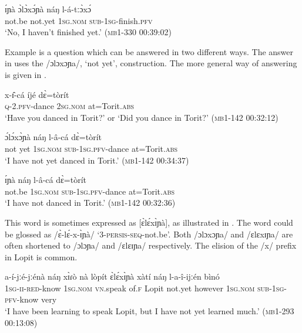 \documentclass[output=paper,colorlinks,citecolor=brown,draftmode]{langscibook}
\begin{document}
\ea\label{ex:lop:8}
        \gll ɪ́ɲà ɔ̀lɔ̀xɔ́ɲà náŋ l-á-tːɔ̀xɔ́ \\ 
             not.be {not.yet} \textsc{1sg.nom} \textsc{sub}{}-1\textsc{sg}{}-finish.\textsc{pfv} \\
        \glt ‘No, I haven’t finished yet.’ (\textsc{mb1-330} \textsc{00:}39:02)
\z

Example  is a question which can be answered in two different ways. The answer in  uses the /ɔlɔxɔɲa/, ‘not yet’, construction. The more general way of answering is given in .  

\ea\label{ex:lop:9}
        \gll x-ɪ̂-cá íjé dɛ̀=tòrít \\ 
             \textsc{q-2.pfv}{}-dance 2\textsc{sg.nom} at=Torit.\textsc{abs} \\
        \glt ‘Have you danced in Torit?’ or ‘Did you dance in Torit?’       (\textsc{mb1-142} 00:32:12)
\z

\ea\label{ex:lop:10}
        \gll ɔ́lɔ́xɔ̀ɲà náŋ l-â-cá dɛ̀=tòrít   \\ 
             not yet 1\textsc{sg.nom} \textsc{sub-1sg.pfv}{}-dance at=Torit.\textsc{abs} \\
        \glt ‘I have not yet danced in Torit.’       (\textsc{mb1-142} \textsc{00:}34:37)
\z

\ea\label{ex:lop:11}
        \gll ɪ́ɲà náŋ l-â-cá dɛ̀=tòrít   \\ 
             not.be 1\textsc{sg.nom} \textsc{sub-1sg.pfv}{}-dance at=Torit.\textsc{abs} \\
        \glt ‘I have not danced in Torit.’       (\textsc{mb1-142} \textsc{00:}32:36)
\z

This word is sometimes expressed as [ɛ̀lɛ́xɪ̀ɲà], as illustrated in . The word could be glossed as /ɛ̀-lɛ́-x-ɪ̀ɲà/ ‘3-\textsc{persis}{}-\textsc{seq}{}-not.be’. Both /ɔlɔxɔɲa/ and /ɛlɛxɪɲa/ are often shortened to /ɔlɔɲa/ and /ɛlɛɪɲa/ respectively. The elision of the /x/ prefix in Lopit is common.

\ea\label{ex:lop:12}
        \gll a-í-jːé-jːénà náŋ xɪ̀ɾò nà lòpít   ɛ̀lɛ́xɪ̀ɲà xàtí náŋ l-a-î-ijːén bìnó\\ 
             \textsc{1sg-ii-red}{}-know \textsc{1sg.nom} \textsc{vn.}speak of.\textsc{f} Lopit  not.yet however \textsc{1sg.nom} \textsc{sub-1sg-pfv-}know very \\
        \glt ‘I have been learning to speak Lopit, but I have not yet learned much.’ (\textsc{mb1-293} 00:13:08)
\z
\end{document}
